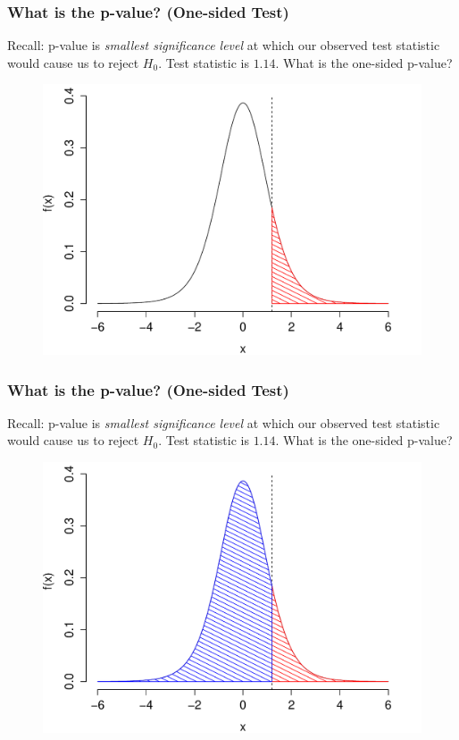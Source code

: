 \begin{frame}
\frametitle{What is the p-value? (One-sided Test)}
\footnotesize
Recall: p-value is \emph{smallest significance level} at which our observed test statistic would cause us to reject $H_0$. \alert{Test statistic is $1.14$. What is the one-sided p-value? }
\begin{figure}
\includegraphics[scale= 0.4]{./images/p_upper3}

\end{figure}

\end{frame}

\begin{frame}
\frametitle{What is the p-value? (One-sided Test)}
\footnotesize
Recall: p-value is \emph{smallest significance level} at which our observed test statistic would cause us to reject $H_0$. \alert{Test statistic is $1.14$. What is the one-sided p-value? }
\begin{figure}
\includegraphics[scale= 0.4]{./images/p_upper4}

\end{figure}

\end{frame}

